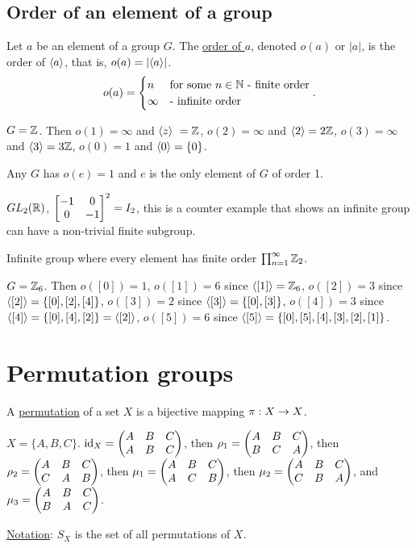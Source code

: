 \documentclass[]{article}
\begin{document}
\subsection{Order of an element of a group}
\begin{definition}
	Let $a$ be an element of a group $G$. The \ul{order of $a$}, denoted $o(a)$ or $|a|$, is the order of $\langle a \rangle$, that is, $o(a) = |\langle a \rangle|$.
	$$o(a) = \begin{cases} n & \text{for some } n\in\mathbb{N} \text{ - finite order} \\ \infty & \text{- infinite order} \end{cases}. $$
\end{definition}
\begin{example}
	$G = \mathbb{Z}$. Then $o(1) = \infty$ and $\langle z \rangle\ = \mathbb{Z}$, $o(2) = \infty$ and $\langle 2 \rangle = 2\mathbb{Z}$, $o(3) = \infty$ and $\langle 3 \rangle = 3\mathbb{Z}$, $o(0) = 1$ and $\langle 0 \rangle = \left\{ 0 \right\}$.
\end{example}
\begin{note}
	Any $G$ has $o(e) = 1$ and $e$ is the only element of $G$ of order 1.
\end{note}
\begin{example}
	$GL_2(\mathbb{R})$, $\begin{bmatrix}-1&0 \\0&-1\end{bmatrix}^2 = I_2$, this is a counter example that shows an infinite group can have a non-trivial finite subgroup.
\end{example}
\begin{example}
	Infinite group where every element has finite order $\prod_{n=1}^\infty \mathbb{Z}_2$.
\end{example}
\begin{example}
	$G = \mathbb{Z}_6$. Then $o([0]) = 1$, $o([1]) = 6$ since $\langle [1] \rangle = \mathbb{Z}_6$, $o([2]) = 3$ since $\langle [2] \rangle = \left\{ [0],[2],[4] \right\}$, $o([3]) = 2$ since $\langle [3] \rangle = \left\{ [0],[3] \right\}$, $o([4]) = 3$ since $\langle [4] \rangle = \left\{ [0],[4],[2] \right\} =\langle [2] \rangle$, $o([5]) = 6$ since $\langle [5] \rangle = \left\{ [0],[5],[4],[3],[2],[1] \right\}$.
\end{example}

\section{Permutation groups}

\begin{definition}
	A \ul{permutation} of a set $X$ is a bijective mapping $\pi: X\rightarrow X$.
\end{definition}
\begin{example}
	$X = \{A,B,C\}$. $\text{id}_X = \begin{pmatrix}A&B&C\\A&B&C\end{pmatrix}$, then $\rho_1 = \begin{pmatrix}A&B&C \\ B&C&A\end{pmatrix}$, then $\rho_2 = \begin{pmatrix}A&B&C\\C&A&B\end{pmatrix}$, then $\mu_1 = \begin{pmatrix}A&B&C\\A&C&B\end{pmatrix}$, then $\mu_2 = \begin{pmatrix}A&B&C\\C&B&A\end{pmatrix}$, and $\mu_3 = \begin{pmatrix}A&B&C\\B&A&C\end{pmatrix}$.
\end{example}
\ul{Notation}: $S_X$ is the set of all permutations of $X$.
\end{document}
